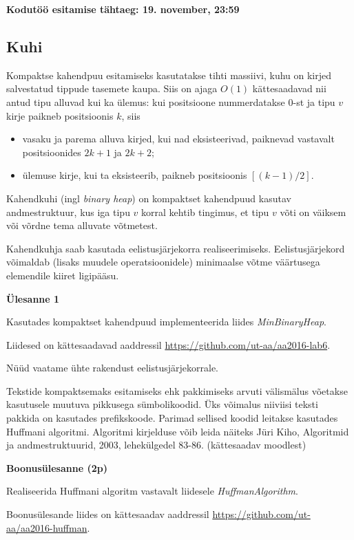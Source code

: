 \documentclass[a4paper]{article}
\begin{document}
\textbf{Kodutöö esitamise tähtaeg: 19. november, 23:59}

{\center
\subsection*{Kuhi}
}

Kompaktse kahendpuu esitamiseks kasutatakse tihti massiivi, kuhu on kirjed
salvestatud tippude tasemete kaupa. Siis on ajaga $O(1)$ kättesaadavad nii antud
tipu alluvad kui ka ülemus: kui positsioone nummerdatakse 0-st ja tipu $v$
kirje paikneb positsioonis $k$, siis

\begin{itemize}
\item vasaku ja parema alluva kirjed, kui nad eksisteerivad, paiknevad vastavalt
positsioonides $2k + 1$ ja $2k + 2$;
\item ülemuse kirje, kui ta eksisteerib, paikneb positsioonis $[(k - 1) / 2]$.
\end{itemize}

Kahendkuhi (ingl \textit{binary heap}) on kompaktset kahendpuud kasutav andmestruktuur, kus iga tipu $v$ korral kehtib tingimus, et tipu $v$ võti on väiksem või võrdne tema alluvate võtmetest. 

Kahendkuhja saab kasutada eelistusjärjekorra realiseerimiseks. Eelistusjärjekord võimaldab (lisaks muudele operatsioonidele) minimaalse võtme väärtusega elemendile kiiret ligipääsu. 
  
\begin{problem}
\textbf{Ülesanne 1}

Kasutades kompaktset kahendpuud implementeerida liides \textit{MinBinaryHeap}.
\end{problem}

Liidesed on kättesaadavad aaddressil \url{https://github.com/ut-aa/aa2016-lab6}.

Nüüd vaatame ühte rakendust eelistusjärjekorrale.
 
Tekstide kompaktsemaks esitamiseks ehk pakkimiseks arvuti välismälus võetakse
kasutusele muutuva pikkusega sümbolikoodid. Üks võimalus niiviisi
teksti pakkida on kasutades prefikskoode. Parimad sellised koodid leitakse
kasutades Huffmani algoritmi. Algoritmi kirjelduse võib leida näiteks Jüri Kiho,
Algoritmid ja andmestruktuurid, 2003, lehekülgedel 83-86. (kättesaadav moodlest)

\begin{problem}
\textbf{Boonusülesanne (2p)}

Realiseerida Huffmani algoritm vastavalt liidesele \textit{HuffmanAlgorithm}.
\end{problem}

Boonusülesande liides on kättesaadav aaddressil \url{https://github.com/ut-aa/aa2016-huffman}.
\end{document}

